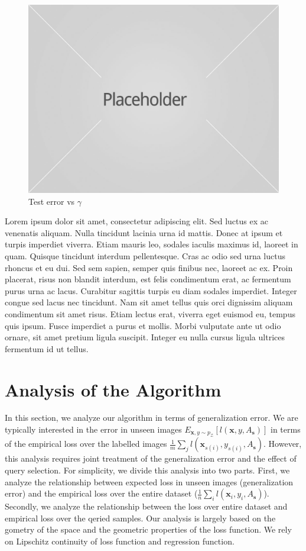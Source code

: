 \documentclass{article}
\begin{document}
\begin{figure}[h]
\includegraphics[width=\columnwidth]{placeholder1.jpg}
\caption{Test error vs $\gamma$}
\end{figure}


Lorem ipsum dolor sit amet, consectetur adipiscing elit. Sed luctus ex ac venenatis aliquam. Nulla tincidunt lacinia urna id mattis. Donec at ipsum et turpis imperdiet viverra. Etiam mauris leo, sodales iaculis maximus id, laoreet in quam. Quisque tincidunt interdum pellentesque. Cras ac odio sed urna luctus rhoncus et eu dui. Sed sem sapien, semper quis finibus nec, laoreet ac ex. Proin placerat, risus non blandit interdum, est felis condimentum erat, ac fermentum purus urna ac lacus. Curabitur sagittis turpis eu diam sodales imperdiet. Integer congue sed lacus nec tincidunt. Nam sit amet tellus quis orci dignissim aliquam condimentum sit amet risus. Etiam lectus erat, viverra eget euismod eu, tempus quis ipsum. Fusce imperdiet a purus et mollis. Morbi vulputate ante ut odio ornare, sit amet pretium ligula suscipit. Integer eu nulla cursus ligula ultrices fermentum id ut tellus.




\section{Analysis of the Algorithm}
In this section, we analyze our algorithm in terms of generalization error.  We are typically interested in the error in unseen images $E_{\mathbf{x},y \sim p_\mathcal{Z}}[l(\mathbf{x},y,A_{\mathbf{s}})]$ in terms of the empirical loss over the labelled images $\frac{1}{m}\sum_j l(\mathbf{x}_{s(i)},y_{s(i)},A_{\mathbf{s}})$. However, this analysis requires joint treatment of the generalization error and the effect of query selection. For simplicity, we divide this analysis into two parts. First, we analyze the relationship between expected loss in unseen images (generalization error) and the empirical loss over the entire dataset ($\frac{1}{n}\sum_i l(\mathbf{x}_i,y_i,A_\mathbf{s})$). Secondly, we analyze the relationship between the loss over entire dataset and empirical loss over the qeried samples. Our analysis is largely based on the gometry of the space and the geometric properties of the loss function. We rely on Lipschitz continuity of loss function and regression function. 
\end{document}
